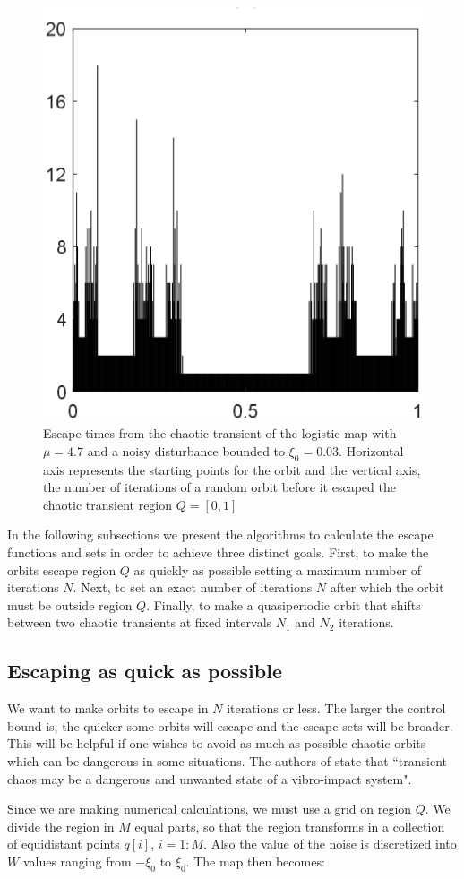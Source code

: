 \begin{figure}
    \centering
    \includegraphics[width=0.5\linewidth]{Images/P1/EscapeTimes.eps}
    \caption{Escape times from the chaotic transient of the logistic map with $\mu=4.7$ and a noisy disturbance bounded to $\xi_0 = 0.03$. Horizontal axis represents the starting points for the orbit and the vertical axis, the number of iterations of a random orbit before it escaped the chaotic transient region $Q = [0,1]$}
    \label{fig:EscapeTimes}
\end{figure}

In the following subsections we present the algorithms to calculate the escape functions and sets in order to achieve three distinct goals. First, to make the orbits escape region $Q$ as quickly as possible setting a maximum number of iterations $N$. Next, to set an exact number of iterations $N$ after which the orbit must be outside region $Q$. Finally, to make a quasiperiodic orbit that shifts between two chaotic transients at fixed intervals $N_1$ and $N_2$ iterations. 

\subsection{Escaping as quick as possible}

We want to make orbits to escape in $N$ iterations or less. The larger the control bound is, the quicker some orbits will escape and the escape sets will be broader. This will be helpful if one wishes to avoid as much as possible chaotic orbits which can be dangerous in some situations. The authors of \cite{AvoidTransient1} state that ``transient chaos may be a dangerous and unwanted state of a vibro-impact system". 

Since we are making numerical calculations, we must use a grid on region $Q$. We divide the region in $M$ equal parts, so that the region transforms in a collection of equidistant points $q[i]$, $i=1:M$. Also the value of the noise is discretized into $W$ values ranging from $-\xi_0$ to $\xi_0$. The map then becomes:

